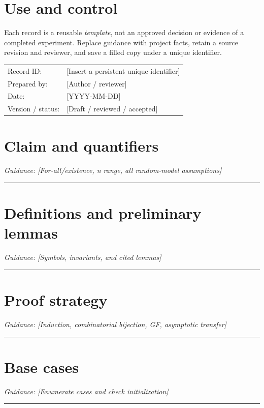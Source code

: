\documentclass[11pt]{article}
\begin{document}
\makedoctitle
\section{Use and control}
Each record is a reusable \emph{template}, not an approved decision or evidence of a completed experiment. Replace guidance with project facts, retain a source revision and reviewer, and save a filled copy under a unique identifier.\par\medskip
\begin{tabularx}{\linewidth}{@{}lX@{}}Record ID: & [Insert a persistent unique identifier] \\ Prepared by: & [Author / reviewer] \\ Date: & [YYYY-MM-DD] \\ Version / status: & [Draft / reviewed / accepted] \\\end{tabularx}
\section{Claim and quantifiers}
\noindent\textit{Guidance: [For-all/existence, n range, all random-model assumptions]}\par\vspace{0.9cm}\hrule\vspace{0.25cm}
\section{Definitions and preliminary lemmas}
\noindent\textit{Guidance: [Symbols, invariants, and cited lemmas]}\par\vspace{0.9cm}\hrule\vspace{0.25cm}
\section{Proof strategy}
\noindent\textit{Guidance: [Induction, combinatorial bijection, GF, asymptotic transfer]}\par\vspace{0.9cm}\hrule\vspace{0.25cm}
\section{Base cases}
\noindent\textit{Guidance: [Enumerate cases and check initialization]}\par\vspace{0.9cm}\hrule\vspace{0.25cm}
\end{document}
